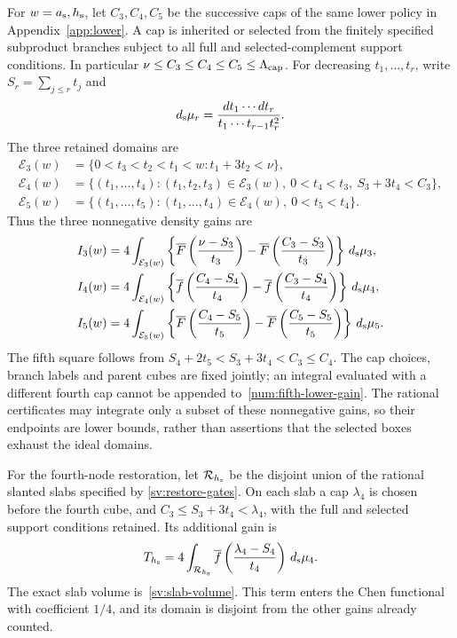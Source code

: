 For $w={a_{\rm s}},{h_{\rm s}}$, let $C_3,C_4,C_5$ be the successive caps of the same
lower policy in Appendix~\ref{app:lower}. A cap is inherited or
selected from the finitely specified subproduct branches subject to
all full and selected-complement support conditions. In particular
$\nu\le C_3\le C_4\le C_5\le\Lambda_{\rm cap}$. For decreasing
$t_1,\ldots,t_r$, write $S_r=\sum_{j\le r}t_j$ and
\[
 {d_{\rm s}}\mu_r=\frac{dt_1\cdots dt_r}{t_1\cdots t_{r-1}t_r^2}.
\]
The three retained domains are
\begin{align*}
 \mathcal E_3(w)&=\{0<t_3<t_2<t_1<w:t_1+3t_2<\nu\},\\
 \mathcal E_4(w)&=\{(t_1,\ldots,t_4):(t_1,t_2,t_3)\in\mathcal E_3(w),
          \ 0<t_4<t_3,\ S_3+3t_4<C_3\},\\
 \mathcal E_5(w)&=\{(t_1,\ldots,t_5):(t_1,\ldots,t_4)\in\mathcal E_4(w),
                                      \ 0<t_5<t_4\}.
\end{align*}
Thus the three nonnegative density gains are
\begin{align}
 I_3(w)&=4\int_{\mathcal E_3(w)}
  \left\{\overline F\left(\frac{\nu-S_3}{t_3}\right)
        -\overline F\left(\frac{C_3-S_3}{t_3}\right)\right\}\,{d_{\rm s}}\mu_3,
                                      \label{num:third-lower-gain}\\
 I_4(w)&=4\int_{\mathcal E_4(w)}
  \left\{\overline f\left(\frac{C_4-S_4}{t_4}\right)
        -\overline f\left(\frac{C_3-S_4}{t_4}\right)\right\}\,{d_{\rm s}}\mu_4,
                                      \label{num:fourth-lower-gain}\\
 I_5(w)&=4\int_{\mathcal E_5(w)}
  \left\{\overline F\left(\frac{C_4-S_5}{t_5}\right)
        -\overline F\left(\frac{C_5-S_5}{t_5}\right)\right\}\,{d_{\rm s}}\mu_5.
                                      \label{num:fifth-lower-gain}
\end{align}
The fifth square follows from
$S_4+2t_5<S_3+3t_4<C_3\le C_4$.
The cap choices, branch labels and parent cubes are fixed jointly;
an integral evaluated with a different fourth cap cannot be appended
to~\eqref{num:fifth-lower-gain}. The rational certificates may integrate
only a subset of these nonnegative gains, so their endpoints are
lower bounds, rather than assertions that the selected boxes exhaust
the ideal domains.

For the fourth-node restoration, let $\mathcal R_{h_{\rm s}}$ be the disjoint
union of the rational slanted slabs specified by
\eqref{sv:restore-gates}. On each slab a cap $\lambda_4$ is chosen
before the fourth cube, and
$C_3\le S_3+3t_4<\lambda_4$, with the full and selected support
conditions retained. Its additional gain is
\begin{equation}
 T_{h_{\rm s}}=4\int_{\mathcal R_{h_{\rm s}}}
       \overline f\left(\frac{\lambda_4-S_4}{t_4}\right)\,{d_{\rm s}}\mu_4.
 \label{num:restoration-integral}
\end{equation}
The exact slab volume is~\eqref{sv:slab-volume}. This term enters the
Chen functional with coefficient $1/4$, and its domain is disjoint
from the other gains already counted.

